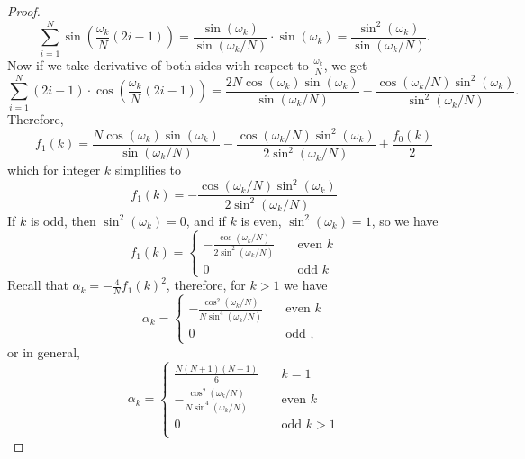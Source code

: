 \documentclass[10pt,a4paper]{amsart}
\begin{document}
\begin{proof}
    \[
    \sum_{i=1}^N \sin\left(\frac{\omega_k}{N}(2i-1)\right) = \frac{\sin\left(\omega_k\right)}{\sin\left(\omega_k/N\right)}\cdot\sin\left(\omega_k\right) = \frac{\sin^2\left(\omega_k\right)}{\sin\left(\omega_k/N\right)}.
    \]
    Now if we take derivative of both sides with respect to $\frac{\omega_k}{N}$, we get
    \[
    \sum_{i=1}^N \left(2i-1\right)\cdot\cos\left(\frac{\omega_k}{N}(2i-1)\right)  = \frac{2N \cos\left(\omega_k\right) \sin\left(\omega_k\right)}{\sin\left(\omega_k/N\right)} - \frac{\cos\left(\omega_k/N\right) \sin^{2}\left(\omega_k\right)}{\sin^{2}\left(\omega_k/N\right)}.
    \]
    Therefore,
    \[
    f_1(k) = \frac{N \cos\left(\omega_k\right) \sin\left(\omega_k\right)}{\sin\left(\omega_k/N\right)} - \frac{\cos\left(\omega_k/N\right) \sin^{2}\left(\omega_k\right)}{2\sin^{2}\left(\omega_k/N\right)}+ \frac{f_0(k)}{2}
    \]
    which for integer $k$ simplifies to
    \[
    f_1(k) = - \frac{\cos\left(\omega_k/N\right) \sin^{2}\left(\omega_k\right)}{2\sin^{2}\left(\omega_k/N\right)}
    \]
    If $k$ is odd, then $\sin^{2}\left(\omega_k\right) = 0$, and if $k$ is even, $\sin^{2}\left(\omega_k\right) = 1$, so we have 
    \[
f_1(k) = 
\begin{cases}
    - \frac{\cos\left(\omega_k/N\right)}{2\sin^{2}\left(\omega_k/N\right)}&\quad \text{even } k\\
    0 &\quad \text{odd } k
\end{cases}
\]
Recall that $\alpha_k = -\frac{4}{N}f_1(k)^2$, therefore, for $k > 1$ we have 
\[
\alpha_k = 
\begin{cases}
    -\frac{\cos^2\left(\omega_k/N\right)}{N\sin^4\left(\omega_k/N\right)}&\quad \text{even } k\\
    0 &\quad \text{odd },
\end{cases}
\]
or in general,
\[
\alpha_k = 
\begin{cases}
    \frac{N(N+1)(N-1)}{6} &\quad k = 1\\
    -\frac{\cos^2\left(\omega_k/N\right)}{N\sin^4\left(\omega_k/N\right)}&\quad \text{even } k\\
    0 &\quad \text{odd } k>1\\
\end{cases}
\]
\end{proof}
\end{document}

